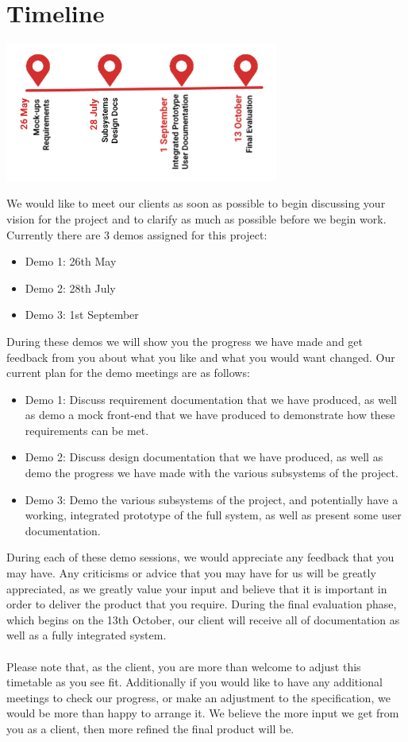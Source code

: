 \section{Timeline}
\begin{center}
    \includegraphics[width=9cm]{../Common/timeline.png}
\end{center}
We would like to meet our clients as soon as possible to begin discussing your vision for the project and to clarify as much as possible
before we begin work. Currently there are 3 demos assigned for this project:
	\begin{itemize}
        \item Demo 1: 26th May
        \item Demo 2: 28th July
        \item Demo 3: 1st September
    \end{itemize}
During these demos we will show you the progress we have made and get feedback from you about what you like and what you would want changed.
Our current plan for the demo meetings are as follows:
	\begin{itemize}
        \item Demo 1: Discuss requirement documentation that we have produced, as well as demo a mock front-end that we have produced to 
        demonstrate how these requirements can be met. 
        \item Demo 2: Discuss design documentation that we have produced, as well as demo the progress we have made with the various subsystems 
        of the project.
        \item Demo 3: Demo the various subsystems of the project, and potentially have a working, integrated prototype of the full system, as 
        well as present some user documentation.
    \end{itemize}
During each of these demo sessions, we would appreciate any feedback that you may have. Any criticisms or advice that you may have for us
will be greatly appreciated, as we greatly value your input and believe that it is important in order to deliver the product that you require.
During the final evaluation phase, which begins on the 13th October, our client will receive all of documentation as well as a fully 
integrated system.\\
\\ 
Please note that, as the client, you are more than welcome to adjust this timetable as you see fit. Additionally if you would like to have any 
additional meetings to check our progress, or make an adjustment to the specification, we would be more than happy to arrange it. We believe 
the more input we get from you as a client, then more refined the final product will be.